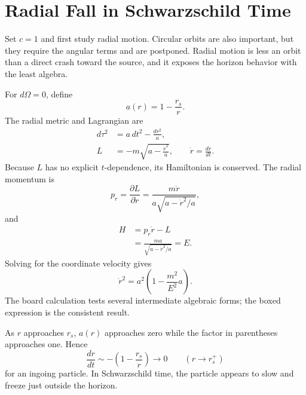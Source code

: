 \section{Radial Fall in Schwarzschild Time}

Set \(c=1\) and first study radial motion.  Circular orbits are also important,
but they require the angular terms and are postponed.  Radial motion is less
an orbit than a direct crash toward the source, and it exposes the horizon
behavior with the least algebra.

\begin{classroomqa}
\end{classroomqa}

For \(d\Omega=0\), define
\begin{equation}
a(r)=1-\frac{r_s}{r}.
\label{eq:l5-a-def}
\end{equation}
The radial metric and Lagrangian are
\begin{align}
d\tau^2&=a\,dt^2-\frac{dr^2}{a},\\
L&=-m\sqrt{a-\frac{\dot r^2}{a}},
\qquad
\dot r=\frac{dr}{dt}.
\label{eq:l5-radial-lagrangian}
\end{align}
Because \(L\) has no explicit \(t\)-dependence, its Hamiltonian is conserved.
The radial momentum is
\begin{equation}
p_r=\frac{\partial L}{\partial\dot r}
=\frac{m\dot r}{a\sqrt{a-\dot r^2/a}},
\label{eq:l5-radial-momentum}
\end{equation}
and
\begin{align}
H
&=p_r\dot r-L\\
&=\frac{ma}{\sqrt{a-\dot r^2/a}}
=E.
\label{eq:l5-radial-energy}
\end{align}
Solving for the coordinate velocity gives
\begin{equation}
\boxed{
\dot r^2
=a^2\left(1-\frac{m^2}{E^2}a\right).
}
\label{eq:l5-radial-velocity}
\end{equation}
The board calculation tests several intermediate algebraic forms; the boxed
expression is the consistent result.

As \(r\) approaches \(r_s\), \(a(r)\) approaches zero while the factor in
parentheses approaches one.  Hence
\begin{equation}
\frac{dr}{dt}
\sim -\left(1-\frac{r_s}{r}\right)
\longrightarrow 0
\qquad(r\longrightarrow r_s^+)
\label{eq:l5-infall-freeze}
\end{equation}
for an ingoing particle.  In Schwarzschild time, the particle appears to slow
and freeze just outside the horizon.

